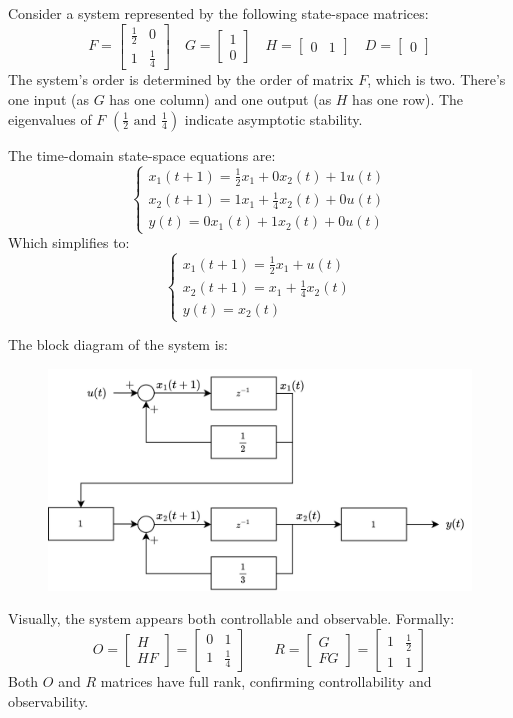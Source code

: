 \begin{example}
    Consider a system represented by the following state-space matrices:
    \[F=\begin{bmatrix} \frac{1}{2} & 0 \\ 1 & \frac{1}{4} \end{bmatrix} \quad G=\begin{bmatrix} 1 \\ 0 \end{bmatrix} \quad H=\begin{bmatrix} 0 & 1 \end{bmatrix} \quad D=\begin{bmatrix} 0 \end{bmatrix}\]
    The system's order is determined by the order of matrix $F$, which is two.
    There's one input (as $G$ has one column) and one output (as $H$ has one row).
    The eigenvalues of $F$ $\left(\frac{1}{2} \text{ and } \frac{1}{4}\right)$ indicate asymptotic stability.

    The time-domain state-space equations are:
    \[\begin{cases}
        x_1(t+1)=\frac{1}{2}x_1+0x_2(t)+1u(t) \\ 
        x_2(t+1)=1x_1+\frac{1}{4}x_2(t)+0u(t) \\ 
        y(t)=0x_1(t)+1x_2(t)+0u(t)
    \end{cases}\]
    Which simplifies to:
    \[\begin{cases}
        x_1(t+1)=\frac{1}{2}x_1+u(t) \\ 
        x_2(t+1)=x_1+\frac{1}{4}x_2(t) \\ 
        y(t)=x_2(t)
    \end{cases}\]

    The block diagram of the system is:
    \begin{figure}[H]
        \centering
        \includegraphics[width=0.6\linewidth]{images/block2.png}
    \end{figure}
    Visually, the system appears both controllable and observable. 
    Formally:
    \[O=\begin{bmatrix} H \\ HF \end{bmatrix}=\begin{bmatrix} 0 & 1 \\ 1 & \frac{1}{4} \end{bmatrix} \qquad R=\begin{bmatrix} G \\ FG \end{bmatrix}=\begin{bmatrix} 1 & \frac{1}{2} \\ 1 & 1 \end{bmatrix}\]
    Both $O$ and $R$ matrices have full rank, confirming controllability and observability.


\end{example}
